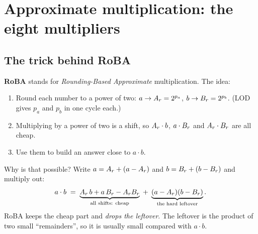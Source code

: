 \section{Approximate multiplication: the eight multipliers}\label{sec:mult}

\subsection{The trick behind RoBA}

\textbf{RoBA} stands for \emph{Rounding-Based Approximate} multiplication. The idea:
\begin{enumerate}
  \item Round each number to a power of two: $a \to A_r = 2^{p_a}$, $b \to B_r = 2^{p_b}$.
        (LOD gives $p_a$ and $p_b$ in one cycle each.)
  \item Multiplying by a power of two is a shift, so $A_r\cdot b$, $a\cdot B_r$ and $A_r\cdot B_r$ are all
        cheap.
  \item Use them to build an answer close to $a\cdot b$.
\end{enumerate}

Why is that possible? Write $a = A_r + (a-A_r)$ and $b = B_r + (b-B_r)$ and multiply out:
\[
  a\cdot b \;=\; \underbrace{A_r\, b + a\,B_r - A_rB_r}_{\text{all shifts: cheap}}
  \;+\; \underbrace{(a-A_r)(b-B_r)}_{\text{the hard leftover}}.
\]
RoBA keeps the cheap part and \emph{drops the leftover}. The leftover is the product of two
small ``remainders'', so it is usually small compared with $a\cdot b$.

